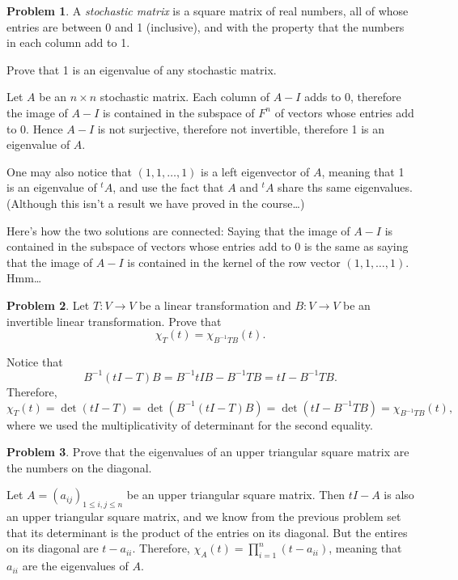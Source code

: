 \documentclass[11pt,oneside]{amsart}
\theoremstyle{definition}
\newtheorem{problem}{Problem}
\begin{document}
    \begin{problem}
        A \emph{stochastic matrix} is a square matrix of real numbers, all of whose entries are between 0 and 1 (inclusive), and with the property that the numbers in each column add to 1.

        Prove that 1 is an eigenvalue of any stochastic matrix.
    \end{problem}
    \begin{solution}
        Let $A$ be an $n\times n$ stochastic matrix. Each column of $A-I$ adds to 0, therefore the image of $A-I$ is contained in the subspace of $F^n$ of vectors whose entries add to 0. Hence $A-I$ is not surjective, therefore not invertible, therefore 1 is an eigenvalue of $A$.

        One may also notice that $(1,1,\dots,1)$ is a left eigenvector of $A$, meaning that 1 is an eigenvalue of $^tA$, and use the fact that $A$ and $^tA$ share ths same eigenvalues. (Although this isn't a result we have proved in the course\dots)

        Here's how the two solutions are connected: Saying that the image of $A-I$ is contained in the subspace of vectors whose entries add to 0 is the same as saying that the image of $A-I$ is contained in the kernel of the row vector $(1,1,\dots,1)$. Hmm\dots
    \end{solution}
    
    \begin{problem}
        Let $T\colon V\to V$ be a linear transformation and $B\colon V\to V$ be an invertible linear transformation. Prove that
        \[\chi_T(t)=\chi_{B^{-1}TB}(t). \]
    \end{problem}
    \begin{solution}
        Notice that
        \[B^{-1}(tI-T)B=B^{-1}tIB-B^{-1}TB=tI-B^{-1}TB.\]
        Therefore,
        \[\chi_T(t)=\det(tI-T)=\det(B^{-1}(tI-T)B)=\det(tI-B^{-1}TB)=\chi_{B^{-1}TB}(t),\]
        where we used the multiplicativity of determinant for the second equality.
    \end{solution}

    \begin{problem}
        Prove that the eigenvalues of an upper triangular square matrix are the numbers on the diagonal.
    \end{problem}
    \begin{solution}
        Let $A=(a_{ij})_{1\leq i,j\leq n}$ be an upper triangular square matrix. Then $tI-A$ is also an upper triangular square matrix, and we know from the previous problem set that its determinant is the product of the entries on its diagonal. But the entires on its diagonal are $t-a_{ii}$. Therefore, $\chi_A(t)=\prod_{i=1}^n (t-a_{ii})$, meaning that $a_{ii}$ are the eigenvalues of $A$.
    \end{solution}
\end{document}
